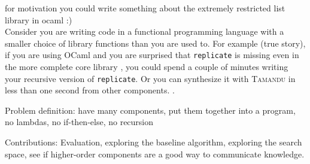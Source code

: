 for motivation you could write something about the extremely restricted list library in ocaml :)\\
Consider you are writing code in a functional programming language with a smaller choice of library functions than you are used to. For example (true story), if you are using OCaml and you are surprised that \lstinline?replicate? is missing even in the more complete core library , you could spend a couple of minutes writing your recursive version of \lstinline?replicate?. Or you can synthesize it with \textsc{Tamandu} in less than one second from other components. .




Problem definition: have many components, put them together into a program, no lambdas, no if-then-else, no recursion
  

  
  
Contributions: Evaluation, exploring the baseline algorithm, exploring the search space, see if higher-order components are a good way to communicate knowledge.
